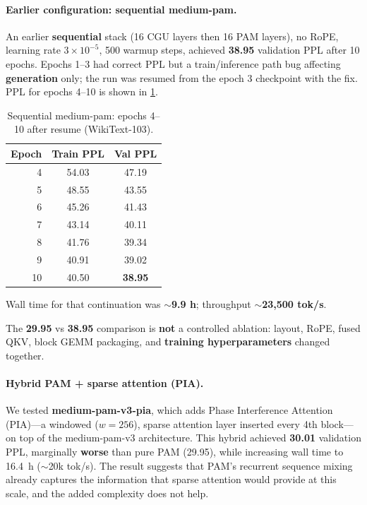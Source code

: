 \documentclass[11pt]{article}
\begin{document}
\paragraph{Earlier configuration: sequential medium-pam.} An earlier \textbf{sequential} stack (16 CGU layers then 16 PAM layers), no RoPE, learning rate $3 \times 10^{-5}$, 500 warmup steps, achieved \textbf{38.95} validation PPL after 10 epochs. Epochs 1--3 had correct PPL but a train/inference path bug affecting \textbf{generation} only; the run was resumed from the epoch 3 checkpoint with the fix. PPL for epochs 4--10 is shown in \cref{tab:seqppl}.

\begin{table}[t]
  \centering
  \caption{Sequential medium-pam: epochs 4--10 after resume (WikiText-103).}
  \label{tab:seqppl}
  \begin{tabular}{@{}rcc@{}}
    \toprule
    Epoch & Train PPL & Val PPL \\
    \midrule
    4 & 54.03 & 47.19 \\
    5 & 48.55 & 43.55 \\
    6 & 45.26 & 41.43 \\
    7 & 43.14 & 40.11 \\
    8 & 41.76 & 39.34 \\
    9 & 40.91 & 39.02 \\
    10 & 40.50 & \textbf{38.95} \\
    \bottomrule
  \end{tabular}
\end{table}

Wall time for that continuation was \textbf{$\sim$9.9 h}; throughput \textbf{$\sim$23,500 tok/s}.

The \textbf{29.95} vs \textbf{38.95} comparison is \textbf{not} a controlled ablation: layout, RoPE, fused QKV, block GEMM packaging, and \textbf{training hyperparameters} changed together.

\paragraph{Hybrid PAM + sparse attention (PIA).} We tested \textbf{medium-pam-v3-pia}, which adds Phase Interference Attention (PIA)---a windowed ($w{=}256$), sparse attention layer inserted every 4th block---on top of the medium-pam-v3 architecture. This hybrid achieved \textbf{30.01} validation PPL, marginally \textbf{worse} than pure PAM (29.95), while increasing wall time to 16.4~h ($\sim$20k tok/s). The result suggests that PAM's recurrent sequence mixing already captures the information that sparse attention would provide at this scale, and the added complexity does not help.
\end{document}

